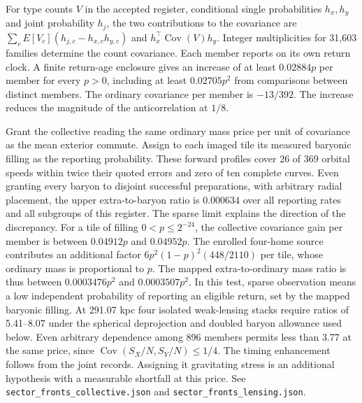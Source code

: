 \documentclass[11pt]{article}
\begin{document}
For type counts \(V\) in the accepted register, conditional single
probabilities \(h_x,h_y\) and joint probability \(h_j\),
the two contributions to the covariance are
\(\sum_c E[V_c](h_{j,c}-h_{x,c}h_{y,c})\) and
\(h_x^\top\operatorname{Cov}(V)h_y\). Integer multiplicities for
31,603 families determine the count covariance. Each member reports
on its own return clock. A finite return-age enclosure gives an increase
of at least \(0.02884p\) per member for every \(p>0\), including at
least \(0.02705p^2\) from comparisons between distinct members.
The ordinary covariance per member is \(-13/392\). The increase
reduces the magnitude of the anticorrelation at \(1/8\).

Grant the collective reading the same ordinary mass price per unit
of covariance as the mean exterior commute. Assign to each imaged
tile its measured baryonic filling as the reporting probability.
These forward profiles cover 26 of 369 orbital speeds within twice
their quoted errors and zero of ten complete curves. Even granting
every baryon to disjoint successful preparations, with arbitrary
radial placement, the upper extra-to-baryon ratio is \(0.000634\)
over all reporting rates and all subgroups of this register.
The sparse limit explains the direction of the discrepancy. For
a tile of filling \(0<p\leq2^{-24}\), the collective covariance gain
per member is between \(0.04912p\) and \(0.04952p\). The enrolled
four-home source contributes an additional factor
\(6p^2(1-p)^2(448/2110)\) per tile, whose ordinary mass is proportional
to \(p\). The mapped extra-to-ordinary mass ratio is thus between
\(0.0003476p^2\) and \(0.0003507p^2\). In this test, sparse observation
means a low independent probability of reporting an eligible return,
set by the mapped baryonic filling.
At 291.07 kpc four isolated weak-lensing stacks require ratios of
5.41--8.07 under the spherical deprojection and doubled baryon
allowance used below. Even arbitrary dependence among 896 members
permits less than 3.77 at the same price, since
\(\operatorname{Cov}(S_X/N,S_Y/N)\leq1/4\).
The timing enhancement follows from the joint records. Assigning it
gravitating stress is an additional hypothesis with a measurable
shortfall at this price. See \texttt{sector\_fronts\_collective.json}
and \texttt{sector\_fronts\_lensing.json}.
\end{document}
